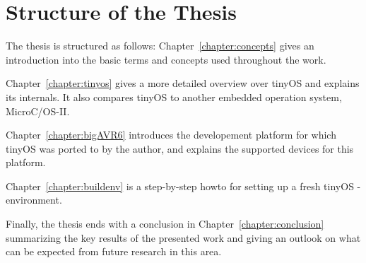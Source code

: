 \section{Structure of the Thesis} \label{sec:introduction:structure}

The thesis is structured as follows:
Chapter~\ref{chapter:concepts} gives an introduction into the
basic terms and concepts used throughout the work.

Chapter~\ref{chapter:tinyos} gives a more detailed overview over tinyOS and explains its internals. It also compares tinyOS to another embedded operation system, MicroC/OS-II.

Chapter~\ref{chapter:bigAVR6} introduces the developement platform for which tinyOS was ported to by the author, and explains the supported devices for this platform. 

Chapter~\ref{chapter:buildenv} is a step-by-step howto for setting up a fresh tinyOS - environment.

Finally, the thesis ends with a conclusion in
Chapter~\ref{chapter:conclusion} summarizing the key results of the
presented work and giving an outlook on what can be expected from
future research in this area.

